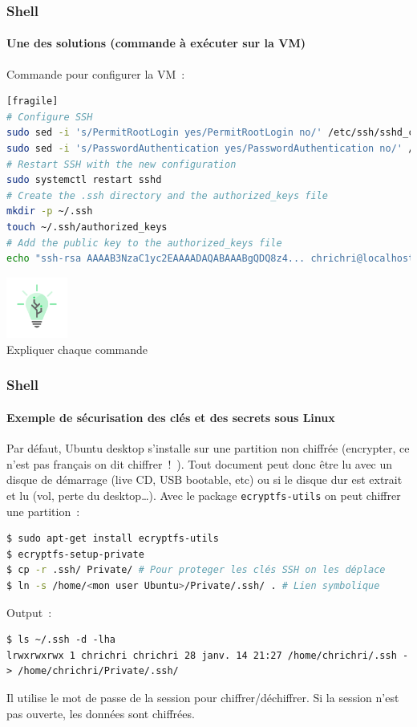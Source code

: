 \documentclass{beamer}
\begin{document}
    \begin{frame}[fragile]
        \transdissolve
        \frametitle{Shell}
        \framesubtitle{Une des solutions (commande à exécuter sur la VM)}
        Commande pour configurer la VM~:
        \begin{lstlisting}[language=bash][fragile]
# Configure SSH
sudo sed -i 's/PermitRootLogin yes/PermitRootLogin no/' /etc/ssh/sshd_config
sudo sed -i 's/PasswordAuthentication yes/PasswordAuthentication no/' /etc/ssh/sshd_config
# Restart SSH with the new configuration
sudo systemctl restart sshd
# Create the .ssh directory and the authorized_keys file
mkdir -p ~/.ssh
touch ~/.ssh/authorized_keys
# Add the public key to the authorized_keys file
echo "ssh-rsa AAAAB3NzaC1yc2EAAAADAQABAAABgQDQ8z4... chrichri@localhost" >> ~/.ssh/authorized_keys
        \end{lstlisting}
        \begin{center}
            \includegraphics[width=2cm]{image/digicomp-lightbulb} \\ Expliquer chaque commande \\
        \end{center}
    \end{frame}

    \begin{frame}[fragile]
        \frametitle{Shell}
        \framesubtitle{Exemple de sécurisation des clés et des secrets sous Linux}
        \transdissolve
        Par défaut, Ubuntu desktop s’installe sur une partition non
        chiffrée (encrypter, ce n’est pas français on dit chiffrer~!~).
        Tout document peut donc être lu avec un disque de
        démarrage (live CD, USB bootable, etc) ou si le disque dur
        est extrait et lu (vol, perte du desktop\ldots).
        \bigbreak
        Avec le package \lstinline{ecryptfs-utils} on peut chiffrer une partition~:
        \begin{lstlisting}[language=bash]
$ sudo apt-get install ecryptfs-utils
$ ecryptfs-setup-private
$ cp -r .ssh/ Private/ # Pour proteger les clés SSH on les déplace
$ ln -s /home/<mon user Ubuntu>/Private/.ssh/ . # Lien symbolique
        \end{lstlisting}
        Output~:
        \begin{lstlisting}
$ ls ~/.ssh -d -lha
lrwxrwxrwx 1 chrichri chrichri 28 janv. 14 21:27 /home/chrichri/.ssh -> /home/chrichri/Private/.ssh/
        \end{lstlisting}
        Il utilise le mot de passe de la session pour chiffrer/déchiffrer.
        Si la session n'est pas ouverte, les données sont chiffrées.
    \end{frame}
\end{document}
